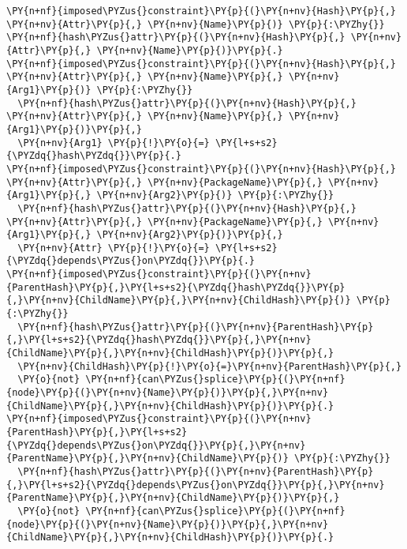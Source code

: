 \begin{Verbatim}[commandchars=\\\{\},fontsize=\footnotesize]
\PY{n+nf}{imposed\PYZus{}constraint}\PY{p}{(}\PY{n+nv}{Hash}\PY{p}{,} \PY{n+nv}{Attr}\PY{p}{,} \PY{n+nv}{Name}\PY{p}{)} \PY{p}{:\PYZhy{}} \PY{n+nf}{hash\PYZus{}attr}\PY{p}{(}\PY{n+nv}{Hash}\PY{p}{,} \PY{n+nv}{Attr}\PY{p}{,} \PY{n+nv}{Name}\PY{p}{)}\PY{p}{.}
\PY{n+nf}{imposed\PYZus{}constraint}\PY{p}{(}\PY{n+nv}{Hash}\PY{p}{,} \PY{n+nv}{Attr}\PY{p}{,} \PY{n+nv}{Name}\PY{p}{,} \PY{n+nv}{Arg1}\PY{p}{)} \PY{p}{:\PYZhy{}}
  \PY{n+nf}{hash\PYZus{}attr}\PY{p}{(}\PY{n+nv}{Hash}\PY{p}{,} \PY{n+nv}{Attr}\PY{p}{,} \PY{n+nv}{Name}\PY{p}{,} \PY{n+nv}{Arg1}\PY{p}{)}\PY{p}{,}
  \PY{n+nv}{Arg1} \PY{p}{!}\PY{o}{=} \PY{l+s+s2}{\PYZdq{}hash\PYZdq{}}\PY{p}{.}
\PY{n+nf}{imposed\PYZus{}constraint}\PY{p}{(}\PY{n+nv}{Hash}\PY{p}{,} \PY{n+nv}{Attr}\PY{p}{,} \PY{n+nv}{PackageName}\PY{p}{,} \PY{n+nv}{Arg1}\PY{p}{,} \PY{n+nv}{Arg2}\PY{p}{)} \PY{p}{:\PYZhy{}}
  \PY{n+nf}{hash\PYZus{}attr}\PY{p}{(}\PY{n+nv}{Hash}\PY{p}{,} \PY{n+nv}{Attr}\PY{p}{,} \PY{n+nv}{PackageName}\PY{p}{,} \PY{n+nv}{Arg1}\PY{p}{,} \PY{n+nv}{Arg2}\PY{p}{)}\PY{p}{,}
  \PY{n+nv}{Attr} \PY{p}{!}\PY{o}{=} \PY{l+s+s2}{\PYZdq{}depends\PYZus{}on\PYZdq{}}\PY{p}{.}
\PY{n+nf}{imposed\PYZus{}constraint}\PY{p}{(}\PY{n+nv}{ParentHash}\PY{p}{,}\PY{l+s+s2}{\PYZdq{}hash\PYZdq{}}\PY{p}{,}\PY{n+nv}{ChildName}\PY{p}{,}\PY{n+nv}{ChildHash}\PY{p}{)} \PY{p}{:\PYZhy{}}
  \PY{n+nf}{hash\PYZus{}attr}\PY{p}{(}\PY{n+nv}{ParentHash}\PY{p}{,}\PY{l+s+s2}{\PYZdq{}hash\PYZdq{}}\PY{p}{,}\PY{n+nv}{ChildName}\PY{p}{,}\PY{n+nv}{ChildHash}\PY{p}{)}\PY{p}{,}
  \PY{n+nv}{ChildHash}\PY{p}{!}\PY{o}{=}\PY{n+nv}{ParentHash}\PY{p}{,}
  \PY{o}{not} \PY{n+nf}{can\PYZus{}splice}\PY{p}{(}\PY{n+nf}{node}\PY{p}{(}\PY{n+nv}{Name}\PY{p}{)}\PY{p}{,}\PY{n+nv}{ChildName}\PY{p}{,}\PY{n+nv}{ChildHash}\PY{p}{)}\PY{p}{.}
\PY{n+nf}{imposed\PYZus{}constraint}\PY{p}{(}\PY{n+nv}{ParentHash}\PY{p}{,}\PY{l+s+s2}{\PYZdq{}depends\PYZus{}on\PYZdq{}}\PY{p}{,}\PY{n+nv}{ParentName}\PY{p}{,}\PY{n+nv}{ChildName}\PY{p}{)} \PY{p}{:\PYZhy{}}
  \PY{n+nf}{hash\PYZus{}attr}\PY{p}{(}\PY{n+nv}{ParentHash}\PY{p}{,}\PY{l+s+s2}{\PYZdq{}depends\PYZus{}on\PYZdq{}}\PY{p}{,}\PY{n+nv}{ParentName}\PY{p}{,}\PY{n+nv}{ChildName}\PY{p}{)}\PY{p}{,}
  \PY{o}{not} \PY{n+nf}{can\PYZus{}splice}\PY{p}{(}\PY{n+nf}{node}\PY{p}{(}\PY{n+nv}{Name}\PY{p}{)}\PY{p}{,}\PY{n+nv}{ChildName}\PY{p}{,}\PY{n+nv}{ChildHash}\PY{p}{)}\PY{p}{.}
\end{Verbatim}
